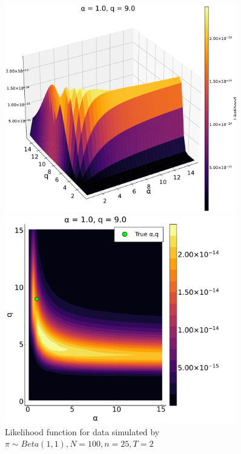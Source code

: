 \documentclass[a4paper, 12pt]{article}
\begin{document}
\begin{figure}
    \centering
    \begin{minipage}{0.55\textwidth}
        \centering
        \includegraphics[width=0.9\textwidth]{../figures/Likelihood_sfplt_1.0.pdf} %
    \end{minipage}\hfill
    \begin{minipage}{0.45\textwidth}
        \centering
        \includegraphics[width=0.9\textwidth]{../figures/Likelihood_contplt_1.0.pdf} %
    \end{minipage}
    \caption{\small Likelihood function for data simulated by $\pi \sim Beta(1, 1), N = 100, n = 25, T = 2$}
\end{figure}
\end{document}
